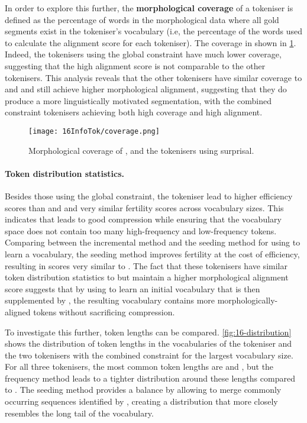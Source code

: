 In order to explore this further, the \textbf{morphological coverage} of a tokeniser is defined as the percentage of words in the morphological data where all gold segments exist in the tokeniser's vocabulary (i.e, the percentage of the words used to calculate the alignment score for each tokeniser). The coverage in shown in \cref{fig:16-coverage}. Indeed, the tokenisers using the global constraint have much lower coverage, suggesting that the high alignment score is not comparable to the other tokenisers. This analysis reveals that the other \bytespan tokenisers have similar coverage to \bpe and \bpewp and still achieve higher morphological alignment, suggesting that they do produce a more linguistically motivated segmentation, with the combined constraint tokenisers achieving both high coverage and high alignment. 

\begin{figure}[!t]
    \centering
    \texttt{[image: 16InfoTok/coverage.png]}
    \caption{Morphological coverage of \bpe, \bpewp and the \bytespan tokenisers using surprisal.}
    \label{fig:16-coverage}
\end{figure}

\paragraph{Token distribution statistics.}

Besides those using the global constraint, the \bytespan tokeniser lead to higher \renyi efficiency scores than \bpe and \bpewp and very similar fertility scores across vocabulary sizes. This indicates that \bytespan leads to good compression while ensuring that the vocabulary space does not contain too many high-frequency and low-frequency tokens. Comparing between the incremental method and the seeding method for using \bytespan to learn a vocabulary, the seeding method improves fertility at the cost of \renyi efficiency, resulting in scores very similar to \bpewp. The fact that these tokenisers have similar token distribution statistics to \bpewp but maintain a higher morphological alignment score suggests that by using \bytespan to learn an initial vocabulary that is then supplemented by \bpe, the resulting vocabulary contains more morphologically-aligned tokens without sacrificing compression.

To investigate this further, token lengths can be compared. \cref{fig:16-distribution} shows the distribution of token lengths in the vocabularies of the \bpewp tokeniser and the two \bytespan tokenisers with the combined constraint for the largest vocabulary size. For all three tokenisers, the most common token lengths are  and , but the frequency method leads to a tighter distribution around these lengths compared to \bpewp. The seeding method provides a balance by allowing \bpe to merge commonly occurring sequences identified by \bytespan, creating a distribution that more closely resembles the long tail of the \bpewp vocabulary.

